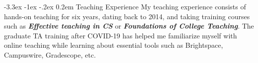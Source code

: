 \documentclass[9pt]{article}
\makeatletter
\def \section {%
    \@startsection {section}
    {1}%
    {\z@}%
    {-3.3ex \@plus -1ex \@minus -.2ex}%
    {0.2em}
    {\normalfont \Large \scshape \bfseries} %
    }
\def \paragraph {%
    \@startsection{paragraph}%
        {4}%
        \z@%
        {0.1em}
        {-\fontdimen 6 \font}%
        {\normalfont \bfseries}%
    }
\makeatother
\begin{document}



\section{Teaching Experience}
My teaching experience consists of hands-on teaching for six years, dating back to 2014, and taking training courses such as \textit{\textbf{Effective teaching in CS}} or \textit{\textbf{Foundations of College Teaching}}. 
The graduate TA training after COVID-19 has helped me familiarize myself with online teaching while learning about essential tools such as Brightspace, Campuswire, Gradescope, etc. 
\end{document}
